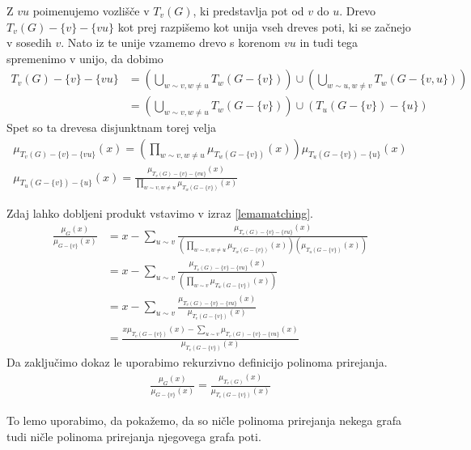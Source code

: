 \begin{dokaz}
    Z \(vu\) poimenujemo vozlišče v \(T_v(G)\), ki predstavlja pot od \(v\) do \(u\). Drevo \(T_v(G) - \{v\} - \{vu\}\) kot prej razpišemo kot unija vseh dreves poti, ki se začnejo v sosedih \(v\). Nato iz te unije vzamemo drevo s korenom \(vu\) in tudi tega spremenimo v unijo, da dobimo
    \begin{align*}
        T_v(G) - \{v\} - \{vu\} &= \left(\bigcup_{w\sim v, w\neq u} T_w(G-\{v\})\right) \cup \left(\bigcup_{w\sim u, w\neq v} T_w(G-\{v,u\})\right)\\
        &= \left(\bigcup_{w\sim v, w\neq u} T_w(G-\{v\})\right) \cup (T_u(G-\{v\}) - \{u\})
    \end{align*}
    Spet so ta drevesa disjunktnam torej velja 
    \begin{align*}
        \mu_{T_v(G) - \{v\} - \{vu\}}(x) = \left(\prod_{w\sim v, w\neq u} \mu_{T_w(G-\{v\})}(x)\right) \mu_{T_u(G-\{v\}) - \{u\}}(x) \\ 
        \mu_{T_u(G-\{v\}) - \{u\}}(x) = \frac{\mu_{T_v(G) - \{v\} - \{vu\}}(x)}{\prod_{w\sim v, w\neq u} \mu_{T_w(G-\{v\})}(x)}
    \end{align*}

    Zdaj lahko dobljeni produkt vstavimo v izraz \ref{lemamatching}.
    \begin{align*}
        \frac{\mu_G(x)}{\mu_{G-\{v\}}(x)} &=x - \sum_{u\sim v}\frac{\mu_{T_v(G) - \{v\} - \{vu\}}(x)}{(\prod_{w\sim v, w\neq u} \mu_{T_w(G-\{v\})}(x))(\mu_{T_u(G-\{v\})}(x))}\\
        &= x - \sum_{u\sim v}\frac{\mu_{T_v(G) - \{v\} - \{vu\}}(x)}{(\prod_{w\sim v} \mu_{T_w(G-\{v\})}(x))}\\
        &= x - \sum_{u\sim v}\frac{\mu_{T_v(G) - \{v\} - \{vu\}}(x)}{\mu_{T_v(G-\{v\})}(x)}\\
        &= \frac{x \mu_{T_v(G-\{v\})}(x) - \sum_{u\sim v} \mu_{T_v(G) - \{v\} - \{vu\}}(x)}{\mu_{T_v(G-\{v\})}(x)}
    \end{align*}
    Da zaključimo dokaz le uporabimo rekurzivno definicijo polinoma prirejanja.
    \begin{align*}
        \frac{\mu_G(x)}{\mu_{G-\{v\}}(x)} = \frac{\mu_{T_v(G)}(x)}{\mu_{T_v(G-\{v\})}(x)}
    \end{align*}
\end{dokaz}

To lemo uporabimo, da pokažemo, da so ničle polinoma prirejanja nekega grafa tudi ničle polinoma prirejanja njegovega grafa poti.

